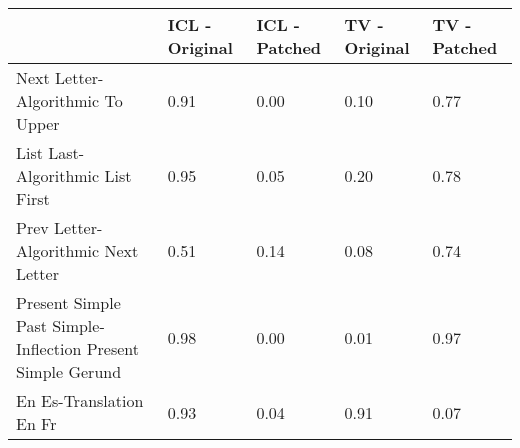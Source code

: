 \begin{tabular}{lllll}
\toprule
 & ICL - Original & ICL - Patched & TV - Original & TV - Patched \\
\midrule
Next Letter-Algorithmic To Upper & 0.91 & 0.00 & 0.10 & 0.77 \\
List Last-Algorithmic List First & 0.95 & 0.05 & 0.20 & 0.78 \\
Prev Letter-Algorithmic Next Letter & 0.51 & 0.14 & 0.08 & 0.74 \\
Present Simple Past Simple-Inflection Present Simple Gerund & 0.98 & 0.00 & 0.01 & 0.97 \\
En Es-Translation En Fr & 0.93 & 0.04 & 0.91 & 0.07 \\
\bottomrule
\end{tabular}
